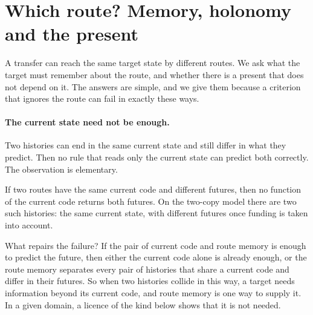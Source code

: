 \section{Which route? Memory, holonomy and the present}
\label{sec:route}

A transfer can reach the same target state by different routes. We ask what
the target must remember about the route, and whether there is a present that
does not depend on it. The answers are simple, and we give them because a
criterion that ignores the route can fail in exactly these ways.

\paragraph{The current state need not be enough.}
Two histories can end in the same current state and still differ in what they
predict. Then no rule that reads only the current state can predict both
correctly. The observation is elementary.

\begin{proposition}
\label{prop:collision}
If two routes have the same current code and different futures, then no
function of the current code returns both futures. On the two-copy model there
are two such histories: the same current state, with different futures once
funding is taken into account.
\end{proposition}

What repairs the failure? If the pair of current code and route memory is
enough to predict the future, then either the current code alone is already
enough, or the route memory separates every pair of histories that share a
current code and differ in their futures. So when two histories collide in this way, a target needs information beyond
its current code, and route memory is one way to supply it. In a given domain,
a licence of the kind below shows that it is not needed.

